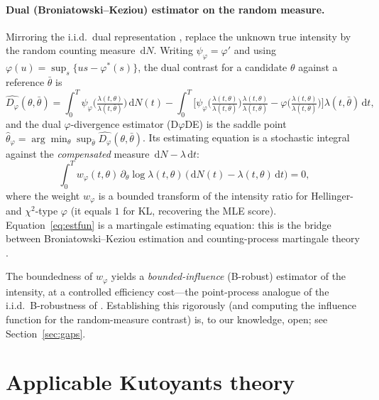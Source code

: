 \documentclass[smallextended,natbib]{svjour3}
\newcommand{\dd}{\,\mathrm{d}}
\newcommand{\Dphi}{D_\varphi}
\begin{document}
\paragraph{Dual (Broniatowski--Keziou) estimator on the random measure.}
Mirroring the i.i.d.\ dual representation \citep{bk2006,bk2009}, replace the
unknown true intensity by the random counting measure $\dd N$. Writing
$\psi_\varphi=\varphi'$ and using
$\varphi(u)=\sup_{s}\{us-\varphi^\ast(s)\}$, the dual contrast for a candidate
$\theta$ against a reference $\bar\theta$ is
\begin{equation}\label{eq:dual}
\widehat{\Dphi}(\theta,\bar\theta)
=\int_0^T \psi_\varphi\!\Big(\tfrac{\lambda(t,\theta)}{\lambda(t,\bar\theta)}\Big)\dd N(t)
-\int_0^T\Big[\psi_\varphi\big(\tfrac{\lambda(t,\theta)}{\lambda(t,\bar\theta)}\big)
\tfrac{\lambda(t,\theta)}{\lambda(t,\bar\theta)}
-\varphi\big(\tfrac{\lambda(t,\theta)}{\lambda(t,\bar\theta)}\big)\Big]\lambda(t,\bar\theta)\dd t,
\end{equation}
and the dual $\varphi$-divergence estimator (D$\varphi$DE) is the saddle point
$\hat\theta_\varphi=\arg\min_\theta\sup_{\bar\theta}\widehat{\Dphi}(\theta,\bar\theta)$.
Its estimating equation is a stochastic integral against the \emph{compensated}
measure $\dd N-\lambda\dd t$:
\begin{equation}\label{eq:estfun}
\int_0^T w_\varphi(t,\theta)\,\partial_\theta\log\lambda(t,\theta)\,
\big(\dd N(t)-\lambda(t,\theta)\dd t\big)=0,
\end{equation}
where the weight $w_\varphi$ is a bounded transform of the intensity ratio for
Hellinger- and $\chi^2$-type $\varphi$ (it equals $1$ for KL, recovering the MLE
score). Equation~\eqref{eq:estfun} is a martingale estimating equation: this is
the bridge between Broniatowski--Keziou estimation and counting-process
martingale theory \citep{abgk1993,rebolledo1980}.

\begin{remark}
The boundedness of $w_\varphi$ yields a \emph{bounded-influence} (B-robust)
estimator of the intensity, at a controlled efficiency cost---the point-process
analogue of the i.i.d.\ B-robustness of \citet{bk2009}. Establishing this
rigorously (and computing the influence function for the random-measure contrast)
is, to our knowledge, open; see Section~\ref{sec:gaps}.
\end{remark}

\section{Applicable Kutoyants theory}\label{sec:kuto}
\end{document}
